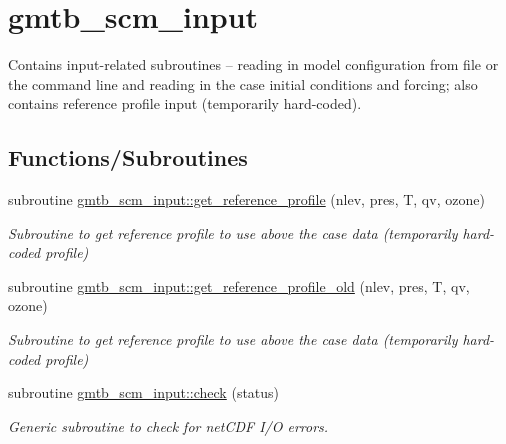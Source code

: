 \hypertarget{group__input}{}\section{gmtb\+\_\+scm\+\_\+input}
\label{group__input}


Contains input-\/related subroutines -- reading in model configuration from file or the command line and reading in the case initial conditions and forcing; also contains reference profile input (temporarily hard-\/coded).  


\subsection*{Functions/\+Subroutines}
\begin{DoxyCompactItemize}
\item 
subroutine \hyperlink{group__input_ga12863f4403aa8cec95a703d7820eae9b}{gmtb\+\_\+scm\+\_\+input\+::get\+\_\+reference\+\_\+profile} (nlev, pres, T, qv, ozone)
\begin{DoxyCompactList}\small\item\em Subroutine to get reference profile to use above the case data (temporarily hard-\/coded profile) \end{DoxyCompactList}\item 
subroutine \hyperlink{group__input_gac2f83200aaf1166b59444fcc3ec14f5c}{gmtb\+\_\+scm\+\_\+input\+::get\+\_\+reference\+\_\+profile\+\_\+old} (nlev, pres, T, qv, ozone)
\begin{DoxyCompactList}\small\item\em Subroutine to get reference profile to use above the case data (temporarily hard-\/coded profile) \end{DoxyCompactList}\item 
subroutine \hyperlink{group__input_gac802d5288c736faf2a5045c7f50b5f23}{gmtb\+\_\+scm\+\_\+input\+::check} (status)
\begin{DoxyCompactList}\small\item\em Generic subroutine to check for net\+C\+DF I/O errors. \end{DoxyCompactList}\end{DoxyCompactItemize}

